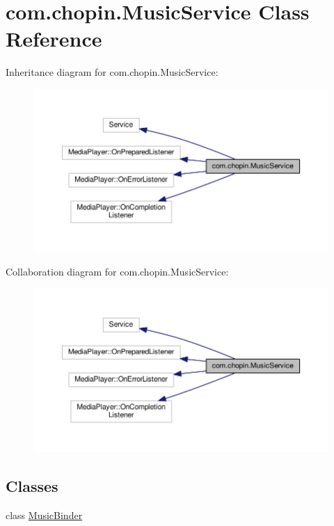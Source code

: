 \hypertarget{classcom_1_1chopin_1_1MusicService}{}\section{com.\+chopin.\+Music\+Service Class Reference}
\label{classcom_1_1chopin_1_1MusicService}


Inheritance diagram for com.\+chopin.\+Music\+Service\+:
\nopagebreak
\begin{figure}[H]
\begin{center}
\leavevmode
\includegraphics[width=350pt]{classcom_1_1chopin_1_1MusicService__inherit__graph}
\end{center}
\end{figure}


Collaboration diagram for com.\+chopin.\+Music\+Service\+:
\nopagebreak
\begin{figure}[H]
\begin{center}
\leavevmode
\includegraphics[width=350pt]{classcom_1_1chopin_1_1MusicService__coll__graph}
\end{center}
\end{figure}
\subsection*{Classes}
\begin{DoxyCompactItemize}
\item 
class \hyperlink{classcom_1_1chopin_1_1MusicService_1_1MusicBinder}{Music\+Binder}
\end{DoxyCompactItemize}
